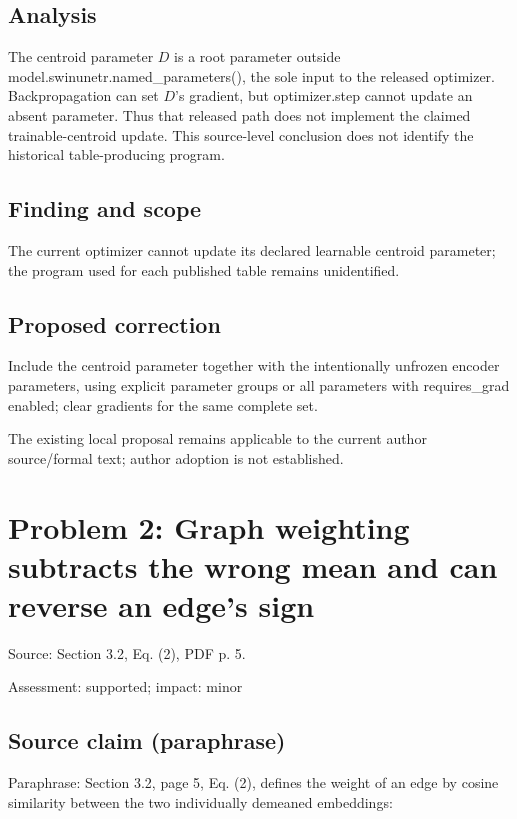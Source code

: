\documentclass[11pt]{article}
\begin{document}
\subsection*{Analysis}

The centroid parameter \(D\) is a root parameter outside model.swinunetr.named\_parameters(), the sole input to the released optimizer. Backpropagation can set \(D\)'s gradient, but optimizer.step cannot update an absent parameter. Thus that released path does not implement the claimed trainable-centroid update. This source-level conclusion does not identify the historical table-producing program.

\subsection*{Finding and scope}

The current optimizer cannot update its declared learnable centroid parameter; the program used for each published table remains unidentified.

\subsection*{Proposed correction}

Include the centroid parameter together with the intentionally unfrozen encoder parameters, using explicit parameter groups or all parameters with requires\_grad enabled; clear gradients for the same complete set.

The existing local proposal remains applicable to the current author source/formal text; author adoption is not established.

\section*{Problem 2: Graph weighting subtracts the wrong mean and can reverse an edge’s sign}

Source: Section 3.2, Eq. (2), PDF p. 5.

Assessment: supported; impact: minor

\subsection*{Source claim (paraphrase)}

Paraphrase: Section 3.2, page 5, Eq. (2), defines the weight of an edge by cosine similarity between the two individually demeaned embeddings:
\end{document}
